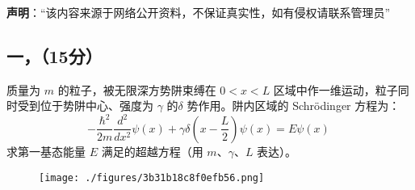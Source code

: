 
\textbf{声明}：“该内容来源于网络公开资料，不保证真实性，如有侵权请联系管理员”

\subsection{一，（15分）}
质量为 $m$ 的粒子，被无限深方势阱束缚在 $0 < x < L$ 区域中作一维运动，粒子同时受到位于势阱中心、强度为 $\gamma$ 的$\delta$ 势作用。阱内区域的 Schrödinger 方程为：
\[
-\frac{\hbar^2}{2m}\frac{d^2 }{dx^2}\psi(x) + \gamma \delta \left(x - \frac{L}{2}\right)\psi(x) = E \psi(x)~
\]
求第一基态能量 $E$ 满足的超越方程（用 $m$、$\gamma$、$L$ 表达）。
\begin{figure}[ht]
\centering
\texttt{[image: ./figures/3b31b18c8f0efb56.png]}
\caption{} \label{fig_SEU01_1}
\end{figure}